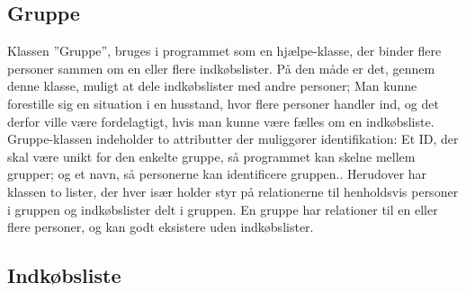 \subsection{Gruppe}
Klassen ''Gruppe'', bruges i programmet som en hjælpe-klasse, der binder flere personer sammen om en eller flere indkøbslister. 
På den måde er det, gennem denne klasse, muligt at dele indkøbslister med andre personer; 
Man kunne forestille sig en situation i en husstand, hvor flere personer handler ind, og det derfor ville være fordelagtigt, hvis man kunne være fælles om en indkøbsliste.
Gruppe-klassen indeholder to attributter der muliggører identifikation: Et ID, der skal være unikt for den enkelte gruppe, så programmet kan skelne mellem grupper; og et navn, så personerne kan identificere gruppen.. 
Herudover har klassen to lister, der hver især holder styr på relationerne til henholdsvis personer i gruppen og indkøbslister delt i gruppen.
En gruppe har relationer til en eller flere personer, og kan godt eksistere uden  indkøbslister.

\subsection{Indkøbsliste}
 

